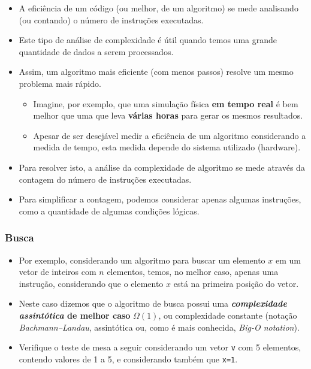 \documentclass[12pt,a4paper]{article}
\begin{document}
    \begin{itemize}
\item
  A eficiência de um código (ou melhor, de um algoritmo) se mede
  analisando (ou contando) o número de instruções executadas.
\item
  Este tipo de análise de complexidade é útil quando temos uma grande
  quantidade de dados a serem processados.
\item
  Assim, um algoritmo mais eficiente (com menos passos) resolve um mesmo
  problema mais rápido.

  \begin{itemize}
  \item
    Imagine, por exemplo, que uma simulação física \textbf{em tempo
    real} é bem melhor que uma que leva \textbf{várias horas} para gerar
    os mesmos resultados.
  \item
    Apesar de ser desejável medir a eficiência de um algoritmo
    considerando a medida de tempo, esta medida depende do sistema
    utilizado (hardware).
  \end{itemize}
\item
  Para resolver isto, a análise da complexidade de algoritmo se mede
  através da contagem do número de instruções executadas.
\item
  Para simplificar a contagem, podemos considerar apenas algumas
  instruções, como a quantidade de algumas condições lógicas.
\end{itemize}

    \hypertarget{busca}{%
\subsubsection{Busca}\label{busca}}

\begin{itemize}
\item
  Por exemplo, considerando um algoritmo para buscar um elemento \(x\)
  em um vetor de inteiros com \(n\) elementos, temos, no melhor caso,
  apenas uma instrução, considerando que o elemento \(x\) está na
  primeira posição do vetor.
\item
  Neste caso dizemos que o algoritmo de busca possui uma
  \textbf{\emph{complexidade assintótica} de melhor caso} \(\Omega(1)\),
  ou complexidade constante (notação \emph{Bachmann--Landau},
  assintótica ou, como é mais conhecida, \emph{Big-O notation}).
\item
  Verifique o teste de mesa a seguir considerando um vetor \texttt{v}
  com 5 elementos, contendo valores de 1 a 5, e considerando também que
  \texttt{x=1}.
\end{itemize}
\end{document}

